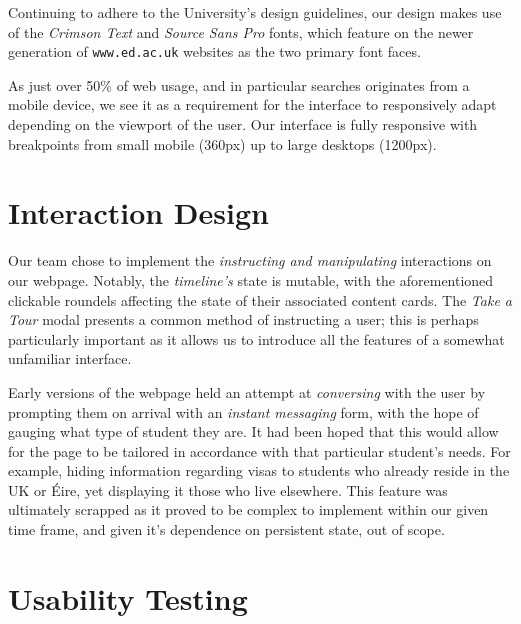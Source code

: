 \documentclass[a4paper, notoc]{tufte-handout}
\begin{document}
Continuing to adhere to the University's design guidelines, our design makes use of the 
\textit{Crimson Text} and \textit{Source Sans Pro} fonts, which feature on the newer 
generation of \texttt{www.ed.ac.uk} websites as the two primary font faces.

As just over 50\% of web usage, and in particular searches originates from a mobile device,
we see it as a requirement for the interface to responsively adapt depending on the 
viewport of the user. Our interface is fully responsive with breakpoints from small
mobile (360px) up to large desktops (1200px).

\section{Interaction Design}\label{label:interaction-design}

Our team chose to implement the \textit{instructing and manipulating} interactions on our 
webpage. Notably, the \textit{timeline's} state is mutable, with the aforementioned
clickable roundels affecting the state of their associated content cards. The \textit{Take a Tour}
modal presents a common method of instructing a user; this is perhaps particularly important
as it allows us to introduce all the features of a somewhat unfamiliar interface.

Early versions of the webpage held an attempt 
at \textit{conversing} with the user by prompting them on arrival with an \textit{instant 
messaging} form, with the hope of gauging what type of student they are. It had been 
hoped that this would allow for the page to be tailored in accordance with that particular 
student's needs. For example, hiding information regarding visas to students who already 
reside in the UK or Éire, yet displaying it those who live elsewhere. This feature was 
ultimately scrapped as it proved to be complex to implement within our given time frame, and 
given it's dependence on persistent state, out of scope.


\section{Usability Testing}\label{sec:usability-testing}

\end{document}
